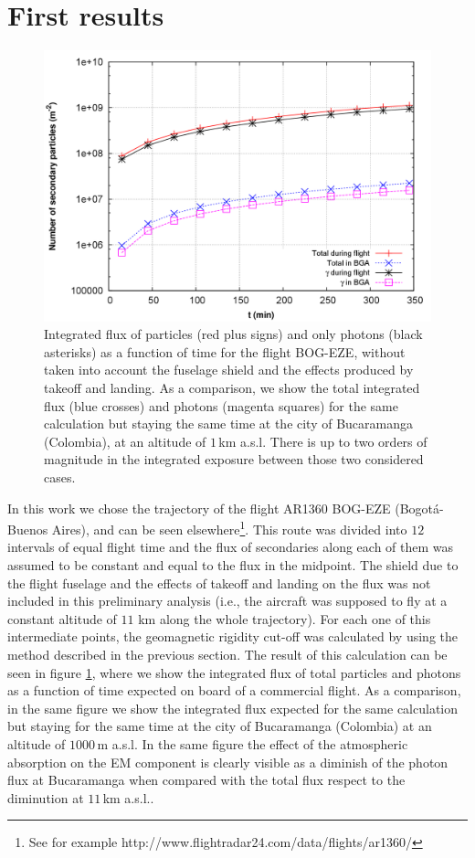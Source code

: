 \documentclass[3p,times,twocolumn]{elsarticle}
\begin{document}
\section{First results}\label{sec:first_results}

\begin{figure}[t!]
\centering
\includegraphics[scale=.14]{g4_dosetime.png}
\caption{Integrated flux of particles (red plus signs) and only photons (black
	asterisks) as a function of time for the flight BOG-EZE, without taken into
	account the fuselage shield and the effects produced by takeoff and
	landing. As a comparison, we show the total integrated flux (blue crosses)
	and photons (magenta squares) for the same calculation but staying the same
	time at the city of Bucaramanga (Colombia), at an altitude of $1$\,km
	a.s.l. There is up to two orders of magnitude in the integrated exposure
	between those two considered cases.}
\label{fig:integrated_bta_bsas}
\end{figure}

In this work we chose the trajectory of the flight AR1360 BOG-EZE
(Bogot\'a-Buenos Aires), and can be seen elsewhere\footnote{See for example
http://www.flightradar24.com/data/flights/ar1360/}. This route was divided into
$12$ intervals of equal flight time and the flux of secondaries along each of
them was assumed to be constant and equal to the flux in the midpoint. The
shield due to the flight fuselage and the effects of takeoff and landing on the
flux was not included in this preliminary analysis (i.e., the aircraft was
supposed to fly at a constant altitude of $11$ km along the whole trajectory).
For each one of this intermediate points, the geomagnetic rigidity cut-off was
calculated by using the method described in the previous section. The result of
this calculation can be seen in figure \ref{fig:integrated_bta_bsas}, where
we show the integrated flux of total particles and photons as a function of
time expected on board of a commercial flight. As a comparison, in the same
figure we show the integrated flux expected for the same calculation but
staying for the same time at the city of Bucaramanga (Colombia) at an altitude
of $1000$\,m a.s.l. In the same figure the effect of the atmospheric absorption
on the EM component is clearly visible as a diminish of the photon flux at
Bucaramanga when compared with the total flux respect to the diminution at
$11$\,km a.s.l..  
\end{document}
